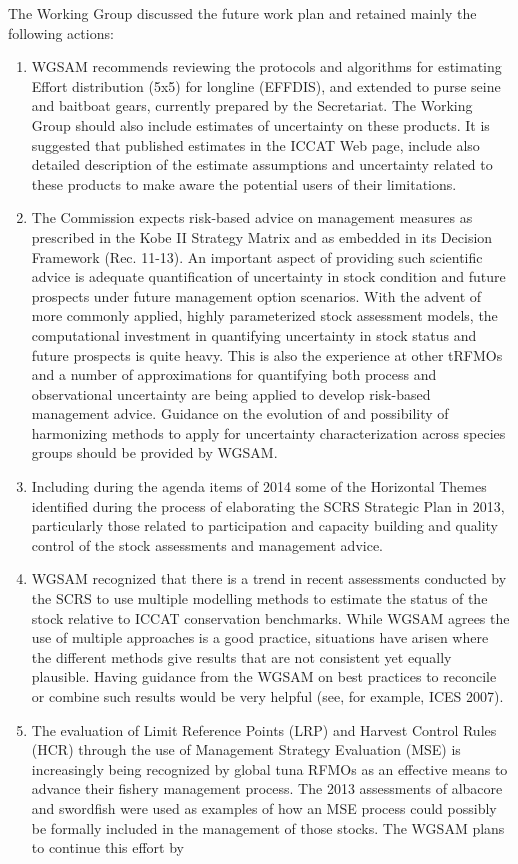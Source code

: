 \documentclass[a4paper,10pt]{article}
\begin{document}
The Working Group discussed the future work plan and retained mainly the following actions:
\begin{enumerate}[1.]
\item WGSAM recommends reviewing the protocols and algorithms for estimating Effort distribution (5x5) for longline (EFFDIS), and extended to purse seine and baitboat gears, currently prepared by the Secretariat. The Working Group should also include estimates of uncertainty on these products. It is suggested that published estimates in the ICCAT Web page, include also detailed description of the estimate assumptions and uncertainty related to these products to make aware the potential users of their limitations.
\item The Commission expects risk-based advice on management measures as prescribed in the Kobe II Strategy Matrix and as embedded in its Decision Framework (Rec. 11-13). An important aspect of providing such scientific advice is adequate quantification of uncertainty in stock condition and future prospects under future management option scenarios. With the advent of more commonly applied, highly parameterized stock assessment models, the computational investment in quantifying uncertainty in stock status and future prospects is quite heavy. This is also the experience at other tRFMOs and a number of approximations for quantifying both process and observational uncertainty are being applied to develop risk-based management advice. Guidance on the evolution of and possibility of harmonizing methods to apply for uncertainty characterization across species groups should be provided by WGSAM.
\item Including during the agenda items of 2014 some of the Horizontal Themes identified during the process of elaborating the SCRS Strategic Plan in 2013, particularly those related to participation and capacity building and quality control of the stock assessments and management advice.
\item WGSAM recognized that there is a trend in recent assessments conducted by the SCRS to use multiple modelling methods to estimate the status of the stock relative to ICCAT conservation benchmarks. While WGSAM agrees the use of multiple approaches is a good practice, situations have arisen where the different methods give results that are not consistent yet equally plausible. Having guidance from the WGSAM on best practices to reconcile or combine such results would be very helpful (see, for example, ICES 2007).
\item The evaluation of Limit Reference Points (LRP) and Harvest Control Rules (HCR) through the  use of Management Strategy Evaluation (MSE) is increasingly 
being recognized by global tuna RFMOs as an effective means to advance their fishery management process.
The 2013 assessments of albacore and swordfish were used as examples of how an MSE process could possibly be 
formally included in the management of those stocks.
The WGSAM plans to continue this effort by 


\end{enumerate}
\end{document}
